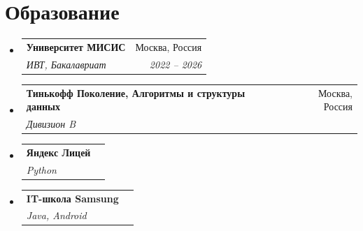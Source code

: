 \documentclass[letterpaper,11pt]{article}
\makeatletter
\newcommand{\resumeSubheading}[4]{
  \vspace{-1pt}\item
    \begin{tabular*}{0.97\textwidth}[t]{l@{\extracolsep{\fill}}r}
      \textbf{#1} & #2 \\
      \textit{\small #3} & \textit{\small #4} \\
    \end{tabular*}\vspace{-5pt}
}
\newcommand{\resumeSubHeadingListStart}{\begin{itemize}[leftmargin=*]}
\newcommand{\resumeSubHeadingListEnd}{\end{itemize}}
\makeatother
\begin{document}
\section{Образование}
  \resumeSubHeadingListStart
    \resumeSubheading
      {Университет МИСИС}{Москва, Россия}
      {ИВТ, Бакалавриат}{2022 -- 2026}
    \resumeSubheading
      {Тинькофф Поколение, Алгоритмы и структуры данных}{Москва, Россия}
      {Дивизион B}{}
    \resumeSubheading
      {Яндекс Лицей}{}
      {Python}{}
    \resumeSubheading
      {IT-школа Samsung}{}
      {Java, Android}{}
  \resumeSubHeadingListEnd

\end{document}
